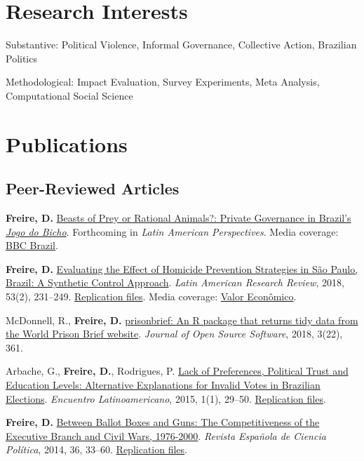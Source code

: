 \documentclass[a4paper]{article}
\renewenvironment{itemize}{
  \begin{list}{}{
    \setlength{\leftmargin}{1.5em}
  }
}{
  \end{list}
}
\begin{document}
\section*{Research Interests}

\begin{itemize}
 	\item Substantive: Political Violence, Informal Governance, Collective Action, Brazilian Politics %
 	\item Methodological: Impact Evaluation, Survey Experiments, Meta Analysis, Computational Social Science 
\end{itemize}


\section*{Publications}

\subsection*{Peer-Reviewed Articles}

\begin{itemize}
	\item \textbf{Freire, D.} \href{https://osf.io/se2jr}{Beasts of Prey or Rational Animals?: Private Governance in Brazil's \emph{Jogo do Bicho}}. Forthcoming in \textit{Latin American Perspectives}. Media coverage: \href{http://www.bbc.com/portuguese/brasil-40140693}{BBC Brazil}.
	\item \textbf{Freire, D.} \href{https://larrlasa.org/articles/10.25222/larr.334/}{Evaluating the Effect of Homicide Prevention Strategies in São Paulo, Brazil: A Synthetic Control Approach}. \textit{Latin American Research Review}, 2018, 53(2), 231--249. \href{https://github.com/danilofreire/homicides-sp-synth}{Replication files}. Media coverage: \href{http://www.valor.com.br/cultura/5111524/sangue-no-asfalto}{Valor Econômico}.
	\item McDonnell, R., \textbf{Freire, D.} \href{https://doi.org/10.21105/joss.00361}{prisonbrief: An R package that returns tidy data from the World Prison Brief website}. \textit{Journal of Open Source Software}, 2018, 3(22), 361. 
	\item Arbache, G., \textbf{Freire, D.}, Rodrigues, P. \href{http://www.iapss.org/wp-content/uploads/2014/10/ELA1.1_2.Lack-of-Preferences-Political-Trust-and-Education-Levels.pdf}{Lack of Preferences, Political Trust and Education Levels: Alternative Explanations for Invalid Votes in Brazilian Elections}. \textit{Encuentro Latinoamericano}, 2015, 1(1), 29--50. \href{https://github.com/danilofreire/invalid-votes-brazil}{Replication files}.
	\item \textbf{Freire, D.} \href{http://recyt.fecyt.es/index.php/recp/article/view/37638}{Between Ballot Boxes and Guns: The Competitiveness of the Executive Branch and Civil Wars, 1976-2000}. \textit{Revista Espa\~{n}ola de Ciencia Pol\'{i}tica}, 2014, 36, 33--60. \href{https://doi.org/10.7910/DVN/NSDUYG}{Replication files}.
\end{itemize}
\end{document}
